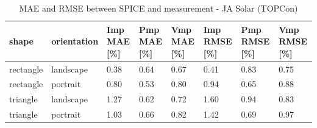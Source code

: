 \begin{table}[htbp]
\centering
\caption{MAE and RMSE between SPICE and measurement - JA Solar (TOPCon)}
\label{tab:mae_rmse_jasolar}
\begin{tabular}{@{}llllllll@{}}
\toprule
shape & orientation & Imp MAE [\%] & Pmp MAE [\%] & Vmp MAE [\%] & Imp RMSE [\%] & Pmp RMSE [\%] & Vmp RMSE [\%] \\
\midrule
rectangle & landscape & 0.38 & 0.64 & 0.67 & 0.41 & 0.83 & 0.75 \\
rectangle & portrait & 0.80 & 0.53 & 0.80 & 0.94 & 0.65 & 0.88 \\
triangle & landscape & 1.27 & 0.62 & 0.72 & 1.60 & 0.94 & 0.83 \\
triangle & portrait & 1.03 & 0.66 & 0.82 & 1.42 & 0.69 & 0.97 \\
\bottomrule
\end{tabular}
\end{table}
